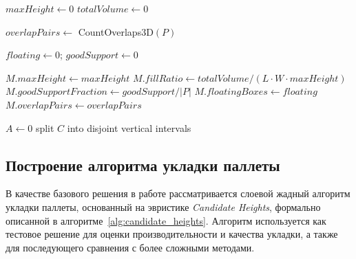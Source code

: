 \begin{algorithm}[H]
\caption{Pallet analysis and metric computation}
\label{alg:pallet_analysis}

$maxHeight \leftarrow 0$\;
$totalVolume \leftarrow 0$\;


$overlapPairs \leftarrow$ \textnormal{CountOverlaps3D}$(P)$\;

$floating \leftarrow 0$; $goodSupport \leftarrow 0$\;

$M.maxHeight \leftarrow maxHeight$\;
$M.fillRatio \leftarrow totalVolume/(L\cdot W\cdot maxHeight)$\;
$M.goodSupportFraction \leftarrow goodSupport/|P|$\;
$M.floatingBoxes \leftarrow floating$\;
$M.overlapPairs \leftarrow overlapPairs$\;

\;
\end{algorithm}



\begin{algorithm}[H]
\caption{Union area computation of contact regions}
\label{alg:union_area}

$A \leftarrow 0$\;
split $C$ into disjoint vertical intervals\;
\;
\end{algorithm}

\subsection{Построение алгоритма укладки паллеты}
В качестве базового решения в работе рассматривается слоевой жадный алгоритм укладки паллеты, основанный на эвристике \textit{Candidate Heights}, формально описанной в алгоритме~\ref{alg:candidate_heights}. Алгоритм используется как тестовое решение для оценки производительности и качества укладки, а также для последующего сравнения с более сложными методами.

